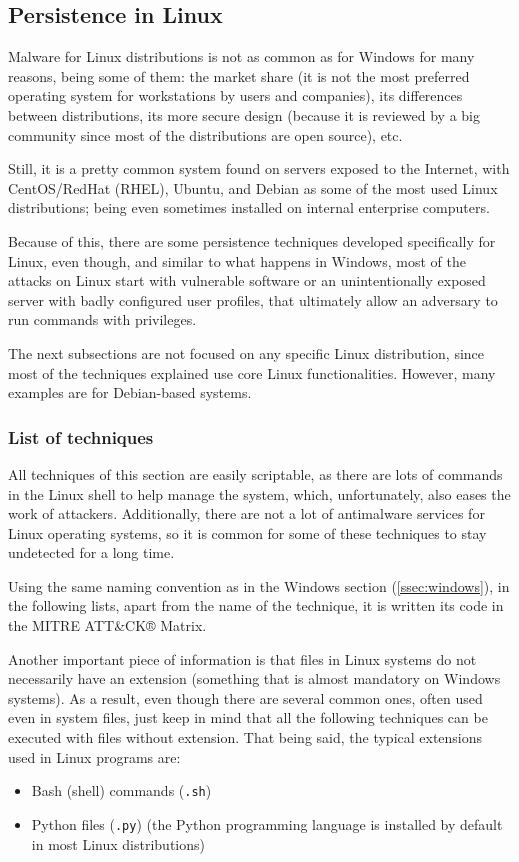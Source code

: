 
\pagebreak
\subsection{Persistence in Linux}
\label{ssec:linux}
Malware for Linux distributions is not as common as for Windows for many reasons, being some of them: the market share\cite{OSMarketShare} (it is not the most preferred operating system for workstations by users and companies), its differences between distributions, its more secure design (because it is reviewed by a big community since most of the distributions are open source), etc. 

Still, it is a pretty common system found on servers exposed to the Internet, with CentOS/RedHat (RHEL), Ubuntu, and Debian\cite{LinuxStatistics} as some of the most used Linux distributions; being even sometimes installed on internal enterprise computers. 

Because of this, there are some persistence techniques developed specifically for Linux, even though, and similar to what happens in Windows, most of the attacks on Linux start with vulnerable software or an unintentionally exposed server with badly configured user profiles, that ultimately allow an adversary to run commands with privileges.

The next subsections are not focused on any specific Linux distribution, since most of the techniques explained use core Linux functionalities. However, many examples are for Debian-based systems.

\subsubsection{List of techniques}
\label{sssec:linuxTec}
All techniques of this section are easily scriptable, as there are lots of commands in the Linux shell to help manage the system, which, unfortunately, also eases the work of attackers. Additionally, there are not a lot of antimalware services for Linux operating systems, so it is common for some of these techniques to stay undetected for a long time.

Using the same naming convention as in the Windows section (\ref{ssec:windows}), in the following lists, apart from the name of the technique, it is written its code in the MITRE ATT\&CK® Matrix\cite{MitreWeb}.

Another important piece of information is that files in Linux systems do not necessarily have an extension (something that is almost mandatory on Windows systems). As a result, even though there are several common ones, often used even in system files, just keep in mind that all the following techniques can be executed with files without extension. That being said, the typical extensions used in Linux programs are: 
\begin{itemize}
\item Bash (shell) commands (\texttt{.sh})
\item Python files (\texttt{.py}) (the Python programming language is installed by default in most Linux distributions)
\end{itemize} 

